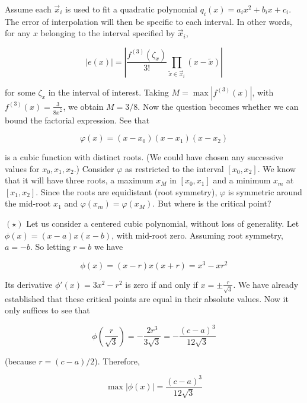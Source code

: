 \documentclass[12pt]{article}
\theoremstyle{definition}
\begin{document}
Assume each $\overrightarrow{x}_i$ is used to fit a quadratic polynomial $q_i(x)
= a_ix^2 + b_ix + c_i$. The error of interpolation will then be specific to each
interval. In other words, for any $x$ belonging to the interval specified by
$\overrightarrow{x}_i$, 

\begin{equation*}
    \left| e(x) \right| = \left|\frac{ f^{(3)}(\zeta_x) }{3!}\prod_{\widetilde{ x }
    \in \overrightarrow{x}_i } (x-\widetilde{ x } )\right|
\end{equation*}

for some $\zeta_x$ in the interval of interest. Taking $M = \max \left| f^{(3)}
(x)\right| $, with $f^{(3)}(x) = \frac{3}{8x^{\frac{5}{}}}$, we obtain $M
= 3 / 8$. Now the question becomes whether we can bound the factorial
expression. See that 

\begin{equation*}
    \varphi(x) = (x-x_0)(x-x_1)(x-x_2)
\end{equation*}

is a cubic function with distinct roots. (We could have chosen any successive
values for $x_0,x_1,x_2$.) Consider $\varphi$ as restricted to the interval
$[x_0, x_2]$. We know that it will have three roots, a maximum $x_M$ in $[x_0, x_1]$
and a minimum $x_m$ at $[x_1, x_2]$. Since the roots are equidistant (root
symmetry), $\varphi$ is symmetric around the mid-root $x_1$ and $\varphi(x_m) =
\varphi(x_M)$. But where is the critical point? 

\begin{shaded}
    $(\star)$ Let us consider a centered cubic polynomial, without loss of
    generality. Let $\phi(x) = (x-a)x(x-b)$, with mid-root zero. Assuming root
    symmetry, $a = -b$. So letting $r = b$ we have 

    \begin{equation*}
        \phi(x) = (x-r)x(x+r) = x^3 -xr^2
    \end{equation*}

    Its derivative $\phi'(x) = 3x^2 - r^2$ is zero if and only if $x = \pm
    \frac{r}{\sqrt{3} }$. We have already established that these critical points
    are equal in their absolute values. Now it only suffices to see that 

    \begin{equation*}
        \phi\left( \frac{r}{\sqrt{3} } \right)  = - \frac{2r^3}{3\sqrt{3} } =-
        \frac{(c-a)^3}{12\sqrt{3} }
    \end{equation*}

    (because $r = (c-a) / 2$). Therefore,

    \begin{equation*}
        \max |\phi(x)| = \frac{(c-a)^3}{12 \sqrt{3} }
    \end{equation*}


\end{shaded}
\end{document}
